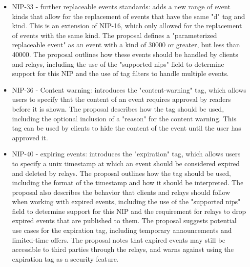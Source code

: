 \begin{itemize}
\item NIP-33 - further replaceable events standards: adds a new range of event kinds that allow for the replacement of events that have the same "d" tag and kind. This is an extension of NIP-16, which only allowed for the replacement of events with the same kind. The proposal defines a "parameterized replaceable event" as an event with a kind of 30000 or greater, but less than 40000. The proposal outlines how these events should be handled by clients and relays, including the use of the "supported nips" field to determine support for this NIP and the use of tag filters to handle multiple events.
\item NIP-36 - Content warning: introduces the "content-warning" tag, which allows users to specify that the content of an event requires approval by readers before it is shown. The proposal describes how the tag should be used, including the optional inclusion of a "reason" for the content warning. This tag can be used by clients to hide the content of the event until the user has approved it.
\item NIP-40 - expiring events: introduces the "expiration" tag, which allows users to specify a unix timestamp at which an event should be considered expired and deleted by relays. The proposal outlines how the tag should be used, including the format of the timestamp and how it should be interpreted. The proposal also describes the behavior that clients and relays should follow when working with expired events, including the use of the "supported nips" field to determine support for this NIP and the requirement for relays to drop expired events that are published to them. The proposal suggests potential use cases for the expiration tag, including temporary announcements and limited-time offers. The proposal notes that expired events may still be accessible to third parties through the relays, and warns against using the expiration tag as a security feature.
\end{itemize}
